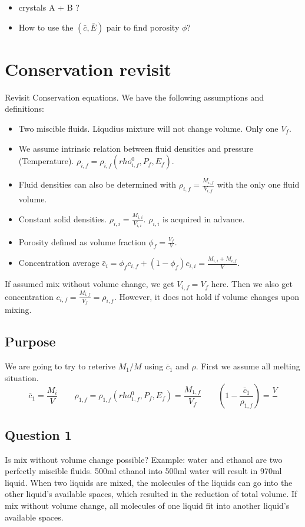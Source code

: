 \begin{itemize}
		  \item crystals A + B ?
		  \item How to use the $(\bar{c}, \bar{E})$ pair to find porosity $\phi$?
\end{itemize}

\newpage

\section{Conservation revisit}
Revisit Conservation equations. We have the following assumptions and definitions:
\begin{itemize}
		  \item Two miscible fluids. Liqudius mixture will not change volume. Only one $V_f$.
		  \item We assume intrinsic relation between fluid densities and pressure (Temperature). $\rho_{i,f} = \rho_{i,f}(rho^0_{i,f}, P_f, E_f)$.
		  \item Fluid densities can also be determined with $\rho_{i,f} = \frac{M_{i,f}}{V_{i,f}}$ with the only one fluid volume.
		  \item Constant solid densities. $\rho_{i,i} = \frac{M_{i,i}}{V_{i,i}}$. $\rho_{i,i}$ is acquired in advance.
		  \item Porosity defined as volume fraction $\phi_f = \frac{V_f}{V}$.
		  \item Concentration average $\bar{c}_i = \phi_f c_{i,f} + (1-\phi_f) c_{i,i} = \frac{M_{i,i} + M_{i,f}}{V}$.
\end{itemize}
If assumed mix without volume change, we get $V_{i,f} = V_{f}$ here.
Then we also get concentration $c_{i,f} = \frac{M_{i,f}}{V_f} = \rho_{i,f}$.
However, it does not hold if volume changes upon mixing.

\subsection{Purpose}
We are going to try to reterive $M_1/M$ using $\bar{c}_1$ and $\rho$.
First we assume all melting situation.
$$\bar{c}_1 = \frac{M_{i}}{V} \quad\quad \rho_{1,f} = \rho_{1,f}(rho^0_{1,f}, P_f, E_f) = \frac{M_{1,f}}{V_f} \quad\quad (1-\frac{\bar{c}_1}{\rho_{1,f}}) = \frac{V}{}$$


\subsection{Question 1}
Is mix without volume change possible? 
Example: water and ethanol are two perfectly miscible fluids.
500ml ethanol into 500ml water will result in 970ml liquid.
When two liquids are mixed, the molecules of the liquids can go into the other liquid's available spaces,
which resulted in the reduction of total volume.
If mix without volume change, all molecules of one liquid fit into another liquid's available spaces.

